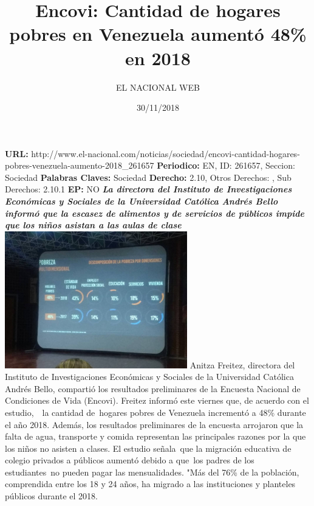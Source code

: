 \documentclass{article}%
\title{\textbf{Encovi: Cantidad de hogares pobres en Venezuela aumentó 48\% en 2018}}%
\author{EL NACIONAL WEB}%
\date{30/11/2018}%
\begin{document}
%
\normalsize%
\maketitle%
\textbf{URL: }%
http://www.el{-}nacional.com/noticias/sociedad/encovi{-}cantidad{-}hogares{-}pobres{-}venezuela{-}aumento{-}2018\_261657\newline%
%
\textbf{Periodico: }%
EN, %
ID: %
261657, %
Seccion: %
Sociedad\newline%
%
\textbf{Palabras Claves: }%
Sociedad\newline%
%
\textbf{Derecho: }%
2.10, %
Otros Derechos: %
, %
Sub Derechos: %
2.10.1\newline%
%
\textbf{EP: }%
NO\newline%
\newline%
%
\textbf{\textit{La directora del Instituto de Investigaciones Económicas y Sociales de la Universidad Católica Andrés Bello informó que la escasez de alimentos y de servicios de públicos impide que los niños asistan a las aulas de clase}}%
\newline%
\newline%
%
\includegraphics[width=300px]{40.jpg}%
\newline%
%
Anitza Freitez, directora del Instituto de Investigaciones Económicas y Sociales de la Universidad Católica Andrés Bello, compartió los resultados preliminares de la Encuesta Nacional de Condiciones de Vida (Encovi).%
\newline%
%
Freitez informó este viernes que, de acuerdo con el estudio,~~la cantidad de~hogares pobres de Venezuela incrementó a 48\% durante el año 2018.%
\newline%
%
Además, los resultados preliminares de la encuesta arrojaron que la falta de agua, transporte y comida representan las principales razones por la que los niños no asisten a clases.%
\newline%
%
El estudio señala~que la migración educativa de colegio privados a públicos aumentó debido a que~los padres de los estudiantes~no pueden pagar las mensualidades.%
\newline%
%
"Más del 76\% de la población, comprendida entre los 18 y 24 años, ha migrado a las instituciones y planteles públicos durante el 2018.%
\newline%
%
\end{document}
